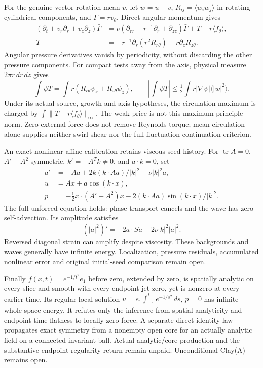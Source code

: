 \documentclass[11pt]{article}
\begin{document}
For the genuine vector rotation mean $v$, let $w=u-v$,
$R_{ij}=\langle w_iw_j\rangle$ in rotating cylindrical components, and
$\bar\Gamma=rv_\theta$. Direct angular momentum gives
\[
 \begin{aligned}
 (\partial_t+v_r\partial_r+v_z\partial_z)\bar\Gamma
 &=\nu(\partial_{rr}-r^{-1}\partial_r+\partial_{zz})\bar\Gamma+T
       +r\langle f_\theta\rangle,\\
 T&=-r^{-1}\partial_r(r^2R_{r\theta})-r\partial_zR_{z\theta}.
 \end{aligned}
\]
Angular pressure derivatives vanish by periodicity, without discarding
the other pressure components. For compact tests away from the axis,
physical measure $2\pi r\,dr\,dz$ gives
\[
 \int\psi T=\int r(R_{r\theta}\psi_r+R_{z\theta}\psi_z),
 \qquad |\int\psi T|\le\tfrac12\int r|\nabla\psi|\langle|w|^2\rangle.
\]
Under its actual source, growth and axis hypotheses, the circulation
maximum is charged by $\int\|T+r\langle f_\theta\rangle\|_\infty$.
The weak price is not this maximum-principle norm. Zero external force
does not remove Reynolds torque; mean circulation alone supplies neither
swirl shear nor the full fluctuation continuation criterion.

An exact nonlinear affine calibration retains viscous seed history.
For $\operatorname{tr}A=0$, $A'+A^2$ symmetric, $k'=-A^Tk\ne0$, and
$a\cdot k=0$, set
\[
 \begin{aligned}
 a'&=-Aa+2k(k\cdot Aa)/|k|^2-\nu|k|^2a,\\
 u&=Ax+a\cos(k\cdot x),\\
 p&=-\tfrac12x\cdot(A'+A^2)x
           -2(k\cdot Aa)\sin(k\cdot x)/|k|^2.
 \end{aligned}
\]
The full unforced equation holds: phase transport cancels and the wave
has zero self-advection. Its amplitude satisfies
\[
 (|a|^2)'=-2a\cdot Sa-2\nu|k|^2|a|^2.
\]
Reversed diagonal strain can amplify despite viscosity. These backgrounds
and waves generally have infinite energy. Localization, pressure residuals,
accumulated nonlinear error and original initial-seed comparison remain open.

Finally $f(x,t)=e^{-1/t^2}e_1$ before zero, extended by zero, is spatially
analytic on every slice and smooth with every endpoint jet zero, yet is
nonzero at every earlier time. Its regular local solution
$u=e_1\int_{-1}^t e^{-1/s^2}\,ds$, $p=0$ has infinite whole-space energy.
It refutes only the inference from spatial analyticity and endpoint time
flatness to locally zero force. A separate direct identity law propagates
exact symmetry from a nonempty open core for an actually analytic field
on a connected invariant ball. Actual analytic/core production and the
substantive endpoint regularity return remain unpaid. Unconditional
Clay(A) remains open.
\end{document}
